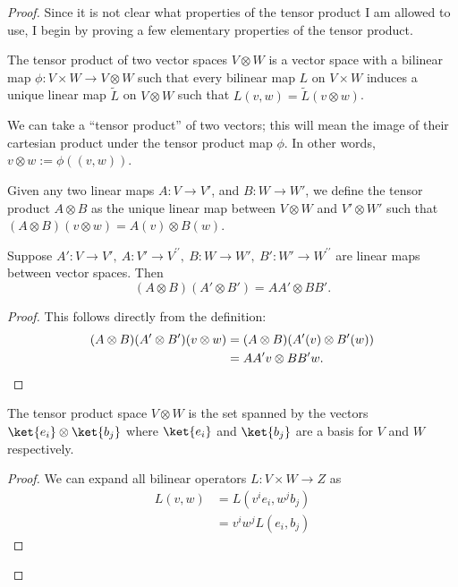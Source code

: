 \begin{proof}
	Since it is not clear what properties of the tensor product I am allowed to use, I begin by proving a few elementary properties of the tensor product.
	\begin{Definition}
		The tensor product of two vector spaces $V\otimes W$ is a vector space with a bilinear map $\phi:V\times W \to V\otimes W$ such that every bilinear map $L$ on $V\times W$ induces a unique linear map $\tilde{L}$ on $V\otimes W$ such that $L(v,w)=\tilde{L}(v\otimes w)$.
	\end{Definition}
	\begin{Remark}
		We can take a ``tensor product'' of two vectors; this will mean the image of their cartesian product under the tensor product map $\phi$. In other words, $v\otimes w := \phi((v,w))$.
	\end{Remark}
	\begin{Remark}
		Given any two linear maps $A:V\to V'$, and $B:W\to W'$, we define the tensor product $A\otimes B$ as the unique linear map between $V\otimes W$ and $V'\otimes W'$ such that $(A\otimes B)(v\otimes w)=A(v)\otimes B(w)$.
	\end{Remark}
	\begin{Theorem}\label{thm:complexsystemsblatt5-1}
		Suppose $A':V \to V',~A:V'\to V^{\prime\prime},~B:W\to W',~B':W'\to W^{\prime\prime}$ are linear maps between vector spaces. Then 
		\[
			(A\otimes B)(A'\otimes B') = A A'\otimes BB'
		.\] 
	\end{Theorem}
	\begin{proof}
		This follows directly from the definition:
		\begin{align*}
			(A\otimes B)(A'\otimes B')(v\otimes w)&= (A\otimes B)(A'(v)\otimes B'(w)) \\
			&= A A'v\otimes BB'w.\qedhere
		\end{align*}
	\end{proof}
	\begin{Theorem}\label{thm:complexsystemsblatt5-2}
		The tensor product space $V\otimes W$ is the set spanned by the vectors $\ket{e_i}\otimes \ket{b_j}$ where $\ket{e_i}$ and $\ket{b_j}$ are a basis for $V$ and $W$ respectively.
	\end{Theorem}
	\begin{proof}
		We can expand all bilinear operators $L:V\times W\to Z$ as
		\begin{align*}
			L(v, w) &= L(v^i e_i, w^j b_j) \\
			&= v^i w^j L(e_i, b_j)  

\end{align*}
\end{proof}
\end{proof}
